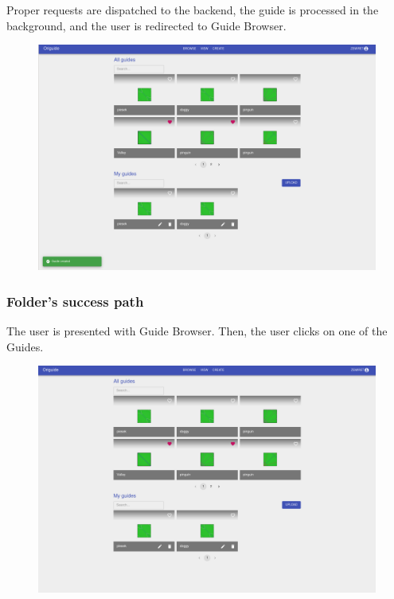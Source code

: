 Proper requests are dispatched to the backend, the guide is processed in the background, and
the user is redirected to Guide Browser.

\begin{figure}[H]
  	\centering
    \includegraphics[width=\textwidth]{assets/5-designerBrowser.png}
\end{figure}

\subsubsection{Folder's success path}

The user is presented with Guide Browser. Then, the user clicks on one of the Guides.

\begin{figure}[H]
  	\centering
    \includegraphics[width=\textwidth]{assets/5-folderOpen.png}
\end{figure}

